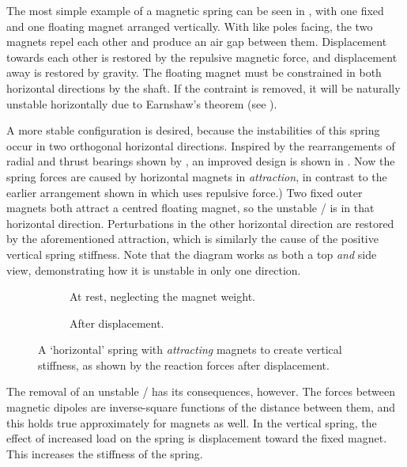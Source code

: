 The most simple example of a magnetic spring can be seen in
, with one fixed and one floating magnet arranged
vertically.  With like poles facing, the two magnets repel each other
and produce an air gap between them. Displacement towards each other
is restored by the repulsive magnetic force, and displacement away is
restored by gravity. The floating magnet must be constrained in both
horizontal directions by the shaft. If the contraint is removed, it
will be naturally unstable horizontally due to Earnshaw's theorem (see
).

A more stable configuration is desired, because the instabilities of
this spring occur in two orthogonal horizontal directions. Inspired by
the rearrangements of radial and thrust bearings shown by
\textcite{yonnet1981}, an improved design is shown in
. Now the spring forces are caused by horizontal
magnets in \emph{attraction}, in contrast to the earlier arrangement
shown in  which uses repulsive force.) Two fixed
outer magnets both attract a centred floating magnet, so the unstable
\dof/ is in that horizontal direction. Perturbations in
the other horizontal direction are restored by the aforementioned
attraction, which is similarly the cause of the positive vertical
spring stiffness. Note that the diagram works as both a top \emph{and}
side view, demonstrating how it is unstable in only one direction.

\begin{figure}
  \begin{subfigure}
    \caption{At rest, neglecting the magnet weight.}
  \end{subfigure}
  \begin{subfigure}
    \caption{After displacement.}
  \end{subfigure}
  \caption[`Horizontal' spring.]{A `horizontal' spring with \emph{attracting}
magnets to create vertical stiffness, as shown by the reaction forces after
displacement.}
\end{figure}

The removal of an unstable \dof/ has its consequences,
however.  The forces between magnetic dipoles are inverse-square
functions of the distance between them, and this holds true
approximately for magnets as well. In the vertical spring, the effect
of increased load on the spring is displacement toward the fixed
magnet. This increases the stiffness of the spring.


